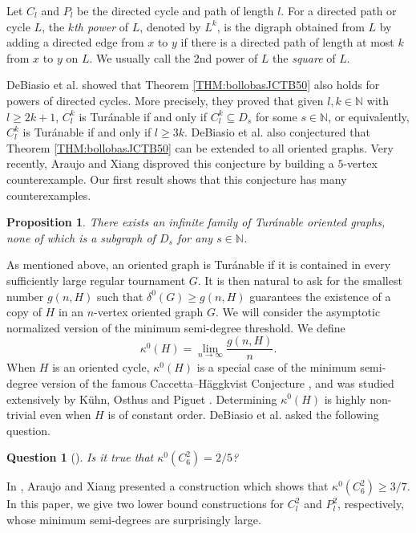 \documentclass[11pt,a4paper,reqno]{amsart}
\newtheorem{proposition}[theorem]{Proposition}
\newtheorem{question}{Question}
\theoremstyle{definition} %
\begin{document}
Let $C_l$ and $P_l$ be the directed cycle and path of length $l$. For a directed path or cycle $L$, the \emph{$k$th power} of $L$, denoted by $L^{k}$, is the digraph obtained from $L$ by adding a
directed edge from $x$ to $y$ if there is a directed path of length at most $k$ from $x$ to $y$ on $L$. We usually call the 2nd power of $L$ the \emph{square} of $L$. 

DeBiasio et al. \cite{debiasioCPC35} showed that Theorem \ref{THM:bollobasJCTB50} also holds for powers of directed cycles.  
More precisely, they proved that given $l,k\in \mathbb{N}$ with $l\geqslant 2k+1$, $C_l^k$ is Tur\'anable if and only if $C_l^k \subseteq D_s$ for some $s\in \mathbb{N}$, or equivalently,  $C_l^k$ is Tur\'anable if and only if $l\geqslant3k$. 
DeBiasio et al. \cite{debiasioCPC35} also conjectured that  Theorem \ref{THM:bollobasJCTB50} can be extended to all oriented graphs. 
Very recently, Araujo and Xiang \cite{araujoARXIV2025} disproved this conjecture by building a $5$-vertex counterexample. Our first result shows that this conjecture has many counterexamples.

\begin{proposition}\label{PROP:manyF} 
There exists an infinite family of Tur\'anable oriented graphs, none of which is a subgraph of $D_s$ for any $s\in\mathbb{N}$.
\end{proposition}

As mentioned above, an oriented graph is  Tur\'anable if it is contained in every sufficiently large regular tournament $G$. 
It is then natural to ask  for the smallest number $g(n,H)$ such that $\delta^{0}(G)\geqslant g(n, H)$ guarantees the existence of a copy of $H$ in an $n$-vertex oriented graph $G$. We will consider the asymptotic normalized version of the minimum semi-degree threshold. We define
$$\kappa^0(H)=\lim_{n\rightarrow\infty}\frac{g(n,H)}{n}.$$
When $H$ is an oriented cycle, $\kappa^0(H)$ is a special case of the minimum semi-degree version of  the famous Caccetta--H\"aggkvist Conjecture   \cite{Caccetta1978}, and was studied extensively by K\"{u}hn, Osthus and Piguet \cite{kuhnEJC34}. Determining $\kappa^0(H)$ is highly non-trivial even when $H$ is of constant order. DeBiasio et al. \cite{debiasioCPC35} asked the following question.

\begin{question}[\cite{debiasioCPC35}]
Is it true that $\kappa^0(C_6^2)=2/5$?
\end{question}
In \cite{araujoARXIV2025}, Araujo and Xiang presented a construction which shows that $\kappa^0(C_6^2)\geqslant 3/7$.  In this paper, we give two lower bound constructions for $C_l^2$ and $P_l^2$, respectively, whose minimum semi-degrees are surprisingly large.
\end{document}
